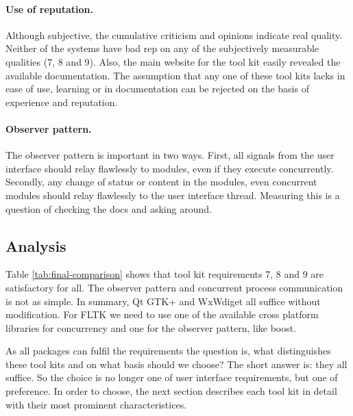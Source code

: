 \paragraph{Use of reputation.} Although subjective, the cumulative criticism
and opinions indicate real quality. Neither of the systems have bad rep on any
of the subjectively measurable qualities (7, 8 and 9). Also, the main website
for the tool kit easily revealed the available documentation. The assumption
that any one of these tool kits lacks in ease of use, learning or in
documentation can be rejected on the basis of experience and reputation. 

\paragraph{Observer pattern.} The observer pattern is important in two ways.
First, all signals from the user interface should relay flawlessly to modules,
even if they execute concurrently. Secondly, any change of status or content in
the modules, even concurrent modules should relay flawlessly to the user
interface thread. Measuring this is a question of checking the docs and asking
around. 


\subsection{Analysis}

Table \ref{tab:final-comparison} shows that tool kit requirements 7, 8 and 9
are satisfactory for all. The observer pattern and concurrent process
communication is not as simple. In summary, Qt GTK+ and WxWdiget all suffice
without modification. For FLTK we need to use one of the available cross
platform libraries for concurrency and one for the observer pattern, like
boost.

As all packages can fulfil the requirements the question is, what distinguishes
these tool kits and on what basis should we choose? The short answer is: they
all suffice. So the choice is no longer one of user interface requirements, but
one of preference. In order to choose, the next section describes each tool kit
in detail with their most prominent characteristices.

